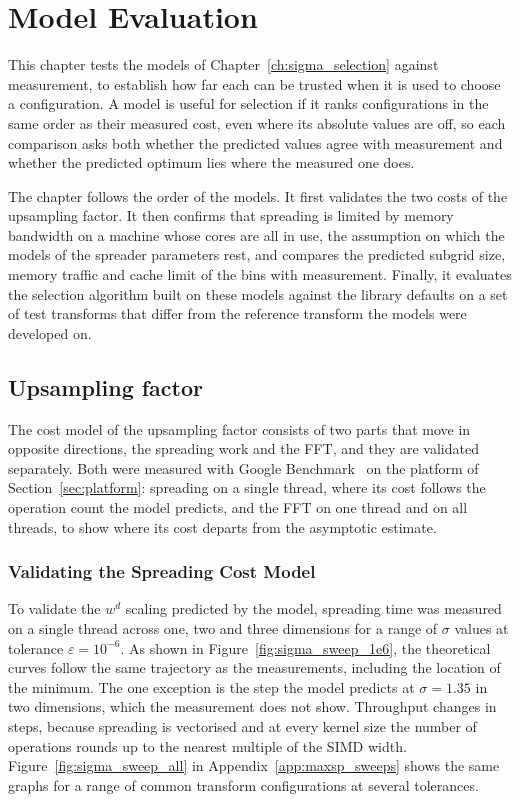 \chapter{Model Evaluation}
\label{ch:parameter_tuning}

This chapter tests the models of Chapter~\ref{ch:sigma_selection} against measurement, to establish how far each can be trusted when it is used to choose a configuration. A model is useful for selection if it ranks configurations in the same order as their measured cost, even where its absolute values are off, so each comparison asks both whether the predicted values agree with measurement and whether the predicted optimum lies where the measured one does.

The chapter follows the order of the models. It first validates the two costs of the upsampling factor. It then confirms that spreading is limited by memory bandwidth on a machine whose cores are all in use, the assumption on which the models of the spreader parameters rest, and compares the predicted subgrid size, memory traffic and cache limit of the bins with measurement. Finally, it evaluates the selection algorithm built on these models against the library defaults on a set of test transforms that differ from the reference transform the models were developed on.

\section{Upsampling factor}

The cost model of the upsampling factor consists of two parts that move in opposite directions, the spreading work and the FFT, and they are validated separately. Both were measured with Google Benchmark~\cite{googlebenchmark} on the platform of Section~\ref{sec:platform}: spreading on a single thread, where its cost follows the operation count the model predicts, and the FFT on one thread and on all threads, to show where its cost departs from the asymptotic estimate.

\subsection{Validating the Spreading Cost Model}
\label{sec:validate_spreading}

To validate the $w^d$ scaling predicted by the model, spreading time was measured on a single thread across one, two and three dimensions for a range of $\sigma$ values at tolerance $\varepsilon = 10^{-6}$. As shown in Figure~\ref{fig:sigma_sweep_1e6}, the theoretical curves follow the same trajectory as the measurements, including the location of the minimum. The one exception is the step the model predicts at $\sigma = 1.35$ in two dimensions, which the measurement does not show. Throughput changes in steps, because spreading is vectorised and at every kernel size the number of operations rounds up to the nearest multiple of the SIMD width. Figure~\ref{fig:sigma_sweep_all} in Appendix~\ref{app:maxsp_sweeps} shows the same graphs for a range of common transform configurations at several tolerances.

